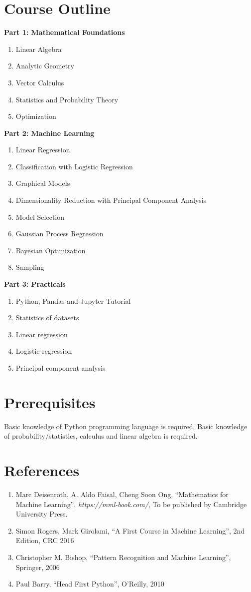 \documentclass[a4, 10pt]{article}
\begin{document}
\section{Course Outline}
\textbf{Part 1: Mathematical Foundations}
\begin{enumerate}
	\item Linear Algebra
	\item Analytic Geometry
	\item Vector Calculus 
	\item Statistics and Probability Theory 
	\item Optimization 
\end{enumerate}
\textbf{Part 2: Machine Learning}
\begin{enumerate}
	\item Linear Regression
	\item Classification with Logistic Regression
	\item Graphical Models
	\item Dimensionality Reduction with Principal Component Analysis
	\item Model Selection
	\item Gaussian Process Regression
	\item Bayesian Optimization
	\item Sampling
\end{enumerate}
\textbf{Part 3: Practicals}
\begin{enumerate}
	\item Python, Pandas and Jupyter Tutorial
	\item Statistics of datasets
	\item Linear regression
	\item Logistic regression
	\item Principal component analysis
\end{enumerate}		
\section{Prerequisites}
Basic knowledge of Python programming language is required. Basic knowledge of
probability/statistics, calculus and linear algebra is required.

\section*{References}
\begin{enumerate}
	\item Marc Deisenroth, A. Aldo Faisal, Cheng Soon Ong, \enquote{Mathematics for Machine Learning}, \textit{https://mml-book.com/}, To be published by Cambridge University Press.
	\item Simon Rogers, Mark Girolami, \enquote{A First Course in Machine Learning}, 2nd Edition, CRC 2016
	\item Christopher M. Bishop, \enquote{Pattern Recognition and Machine Learning},
	Springer, 2006
	\item Paul Barry, \enquote{Head First Python}, O'Reilly, 2010

\end{enumerate}
\end{document}
